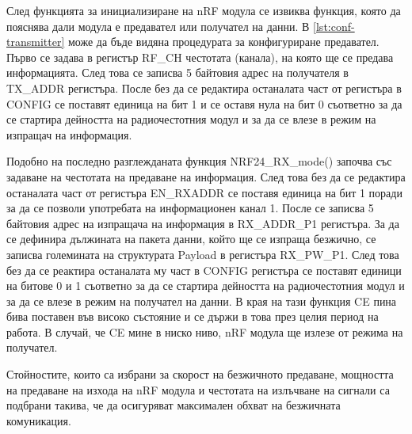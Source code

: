 

След функцията за инициализиране на nRF модула се извиква функция, която да пояснява дали модула е предавател или получател на данни. В \autoref{lst:conf-transmitter} може да бъде видяна процедурата за конфигуриране предавател. Първо се задава в регистър RF\_CH честотата (канала), на която ще се предава информацията. След това се записва 5 байтовия адрес на получателя в TX\_ADDR регистъра. После без да се редактира останалата част от регистъра в CONFIG се поставят единица на бит 1 и се оставя нула на бит 0 съответно за да се стартира дейността на радиочестотния модул и за да се влезе в режим на изпращач на информация. 



Подобно на последно разглежданата функция NRF24\_RX\_mode() започва със задаване на честотата на предаване на информация. След това без да се редактира останалата част от регистъра EN\_RXADDR се поставя единица на бит 1 поради за да се позволи употребата на информационен канал 1. После се записва 5 байтовия адрес на изпращача на информация в RX\_ADDR\_P1 регистъра. За да се дефинира дължината на пакета данни, който ще се изпраща безжично, се записва големината на структурата Payload в регистъра RX\_PW\_P1. След това без да се реактира останалата му част в CONFIG регистъра се поставят единици на битове 0 и 1 съответно за да се стартира дейността на радиочестотния модул и за да се влезе в режим на получател на данни. В края на тази функция CE пина бива поставен във високо състояние и се държи в това през целия период на работа. В случай, че CE мине в ниско ниво, nRF модула ще излезе от режима на получател.



Стойностите, които са избрани за скорост на безжичното предаване, мощността на предаване на изхода на nRF модула и честотата на излъчване на сигнали са подбрани такива, че да осигуряват максимален обхват на безжичната комуникация.



